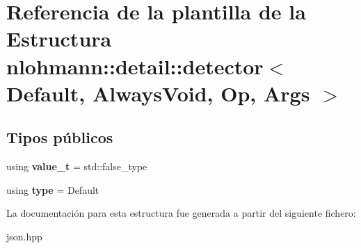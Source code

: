 \hypertarget{structnlohmann_1_1detail_1_1detector}{}\section{Referencia de la plantilla de la Estructura nlohmann\+:\+:detail\+:\+:detector$<$ Default, Always\+Void, Op, Args $>$}
\label{structnlohmann_1_1detail_1_1detector}
\subsection*{Tipos públicos}
\begin{DoxyCompactItemize}
\item 
\mbox{\label{structnlohmann_1_1detail_1_1detector_a5a132aab543d1706e2439268faf8d487}} 
using {\bfseries value\+\_\+t} = std\+::false\+\_\+type
\item 
\mbox{\label{structnlohmann_1_1detail_1_1detector_a0cd69423587748bf3d3d702cc7b7c2ce}} 
using {\bfseries type} = Default
\end{DoxyCompactItemize}


La documentación para esta estructura fue generada a partir del siguiente fichero\+:\begin{DoxyCompactItemize}
\item 
json.\+hpp\end{DoxyCompactItemize}
